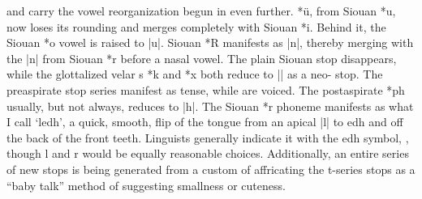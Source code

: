 \documentclass[output=paper]{LSP/langsci}
\begin{document}
 and  carry the vowel reorganization begun in  even further.   *\"u, from Siouan *u, now loses its rounding and merges completely with Siouan *i.  Behind it, the Siouan *o vowel is raised to |u|.  Siouan *R manifests as |n|, thereby merging with the |n| from Siouan *r before a nasal vowel.  The plain Siouan  stop disappears, while the glottalized velar s *k\textsuperscript{} and *x\textsuperscript{} both reduce to |\textsuperscript{}| as a neo- stop.  The preaspirate stop series manifest as tense, while  are voiced.  The postaspirate *ph usually, but not always, reduces to |h|.  The Siouan *r phoneme manifests as what I call `ledh', a quick, smooth, flip of the tongue from an apical |l| to edh and off the back of the front teeth.  Linguists generally indicate it with the edh symbol, , though l and r would be equally reasonable choices.  Additionally, an entire series of new stops is being generated from a custom of affricating the t-series stops as a ``baby talk'' method of suggesting smallness or cuteness.
\end{document}

